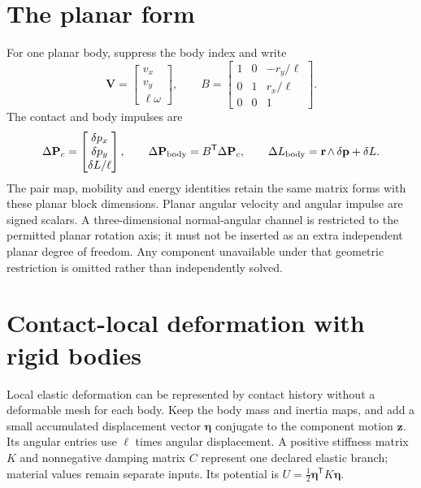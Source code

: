 \documentclass[11pt,a4paper]{article}
\newcommand{\rw}[1]{\mathord{#1\mkern2mu\wedge}}
\begin{document}
\section{The planar form}
For one planar body, suppress the body index and write
\begin{equation}
\mathbf{V}=\begin{bmatrix}v_x\\v_y\\\ell\omega\end{bmatrix},\qquad
B=\begin{bmatrix}1&0&-r_y/\ell\\0&1&r_x/\ell\\0&0&1\end{bmatrix}.
\end{equation}
The contact and body impulses are
\begin{equation}
\Delta\mathbf{P}_c=\begin{bmatrix}\delta p_x\\\delta p_y\\\delta L/\ell\end{bmatrix},\qquad
\Delta \mathbf{P}_{\rm body}=B^{\mathsf T}\Delta\mathbf{P}_c,\qquad
\Delta L_{\rm body}=\rw{\mathbf{r}}\,\delta \mathbf{p}+\delta L.
\end{equation}
The pair map, mobility and energy identities retain the same matrix forms with these planar block dimensions. Planar angular velocity and angular impulse are signed scalars. A three-dimensional normal-angular channel is restricted to the permitted planar rotation axis; it must not be inserted as an extra independent planar degree of freedom. Any component unavailable under that geometric restriction is omitted rather than independently solved.

\section{Contact-local deformation with rigid bodies}
Local elastic deformation can be represented by contact history without a deformable mesh for each body. Keep the body mass and inertia maps, and add a small accumulated displacement vector $\boldsymbol\eta$ conjugate to the component motion $\mathbf z$. Its angular entries use $\ell$ times angular displacement. A positive stiffness matrix $K$ and nonnegative damping matrix $C$ represent one declared elastic branch; material values remain separate inputs. Its potential is $U=\tfrac12\boldsymbol\eta^{\mathsf T}K\boldsymbol\eta$.
\end{document}
